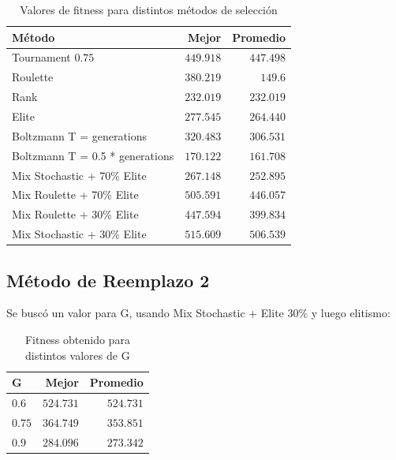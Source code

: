 \documentclass[letterpaper,twocolumn,10pt]{article}
\begin{document}
\begin{table}[H]

\begin{center}
\begin{tabular}{l | r | r}
Método & Mejor & Promedio \\
\hline
Tournament $0.75$ & $449.918$ & $447.498$ \\
Roulette & $380.219$ & $149.6$ \\
Rank & $232.019$ & $232.019$ \\
Elite & $277.545$ & $264.440$ \\
Boltzmann T = generations & $320.483$ & $306.531$ \\
Boltzmann T = 0.5 * generations & $170.122$ & $161.708$ \\
Mix Stochastic + 70\% Elite & $267.148$ & $252.895$ \\
Mix Roulette + 70\% Elite & $505.591$ & $446.057$ \\
Mix Roulette + 30\% Elite & $447.594$ & $399.834$ \\
Mix Stochastic + 30\% Elite & $515.609$ & $506.539$ \\
\end{tabular}
\end{center}

\caption{Valores de fitness para distintos métodos de selección}
\label{fig:seleccion}

\end{table}

\subsection{Método de Reemplazo 2}

Se buscó un valor para G, usando Mix Stochastic + Elite 30\% y luego elitismo:
\begin{table}[H]

\begin{center}
\begin{tabular}{l | r | r}
G & Mejor & Promedio \\
\hline
$0.6$ & $524.731$ & $524.731$ \\
$0.75$ & $364.749$ & $353.851$ \\
$0.9$ & $284.096$ & $273.342$ \\
\end{tabular}
\end{center}

\caption{Fitness obtenido para distintos valores de G}
\label{fig:g-reemplazo2}

\end{table}
\end{document}
